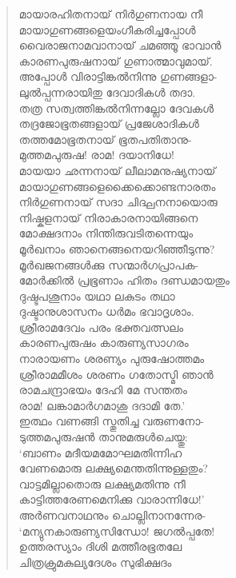 \begin{verse}
മായാരഹിതനായ് നിര്‍ഗുണനായ നീ\\
മായാഗുണങ്ങളെയംഗീകരിച്ചപ്പോള്‍\\
വൈരാജനാമവാനായ് ചമഞ്ഞൂ ഭാവാന്‍\\
കാരണപുരുഷനായ് ഗുണാത്മാവുമായ്.\\
അപ്പോള്‍ വിരാട്ടിങ്കല്‍നിന്നു ഗുണങ്ങളാ-\\
ലുല്‍പ്പന്നരായിതു ദേവാദികള്‍ തദാ.\\
തത്ര സത്വത്തിങ്കല്‍നിന്നല്ലോ ദേവകള്‍\\
തദ്രജോഭൂതങ്ങളായ് പ്രജേശാദികള്‍\\
തത്തമോഭൂതനായ് ഭൂതപതിതാനു-\\
മുത്തമപുരുഷ! രാമ! ദയാനിധേ!\\
മായയാ ഛന്നനായ് ലീലാമനുഷ്യനായ്\\
മായാഗുണങ്ങളെക്കൈക്കൊണ്ടനാരതം\\
നിര്‍ഗുണനായ് സദാ ചിദ്ഘനനായൊരു\\
നിഷ്കളനായ് നിരാകാരനായിങ്ങനെ\\
മോക്ഷദനാം നിന്തിരുവടിതന്നെയും\\
മൂര്‍ഖനാം ഞാനെങ്ങനെയറിഞ്ഞീടുന്നു?\\
മൂര്‍ഖജനങ്ങള്‍ക്കു സന്മാര്‍ഗപ്രാപക-\\
മോര്‍ക്കില്‍ പ്രഭൂണാം ഹിതം ദണ്ഡമായതും\\
ദുഷ്ടപശൂനാം യഥാ ലകുടം തഥാ\\
ദുഷ്ടാനുശാസനം ധര്‍മം ഭവാദൃശാം.\\
ശ്രീരാമദേവം പരം ഭക്തവത്സലം\\
കാരണപുരുഷം കാരുണ്യസാഗരം\\
നാരായണം ശരണ്യം പുരുഷോത്തമം\\
ശ്രീരാമമീശം ശരണം ഗതോസ്മി ഞാന്‍\\
രാമചന്ദ്രാഭയം ദേഹി മേ സന്തതം\\
രാമ! ലങ്കാമാര്‍ഗമാശു ദദാമി തേ.’\\
ഇത്ഥം വണങ്ങി സ്തുതിച്ച വരുണനോ-\\
ടുത്തമപുരുഷന്‍ താനുമരുള്‍ചെയ്തു:\\
‘ബാണം മദീയമമോഘമതിന്നിഹ\\
വേണമൊരു ലക്ഷ്യമെന്തതിന്നുള്ളതും?\\
വാട്ടമില്ലാതൊരു ലക്ഷ്യമതിന്നു നീ\\
കാട്ടിത്തരേണമെനിക്കു വാരാന്നിധേ!’\\
അര്‍ണവനാഥനും ചൊല്ലിനാനന്നേര-\\
‘മന്യുനകാരുണ്യസിന്ധോ! ജഗല്‍പ്പതേ!\\
ഉത്തരസ്യാം ദിശി മത്തീരഭൂതലേ\\
ചിത്രക്രുമകുല്യദേശം സുഭിക്ഷദം\\

\end{verse}
